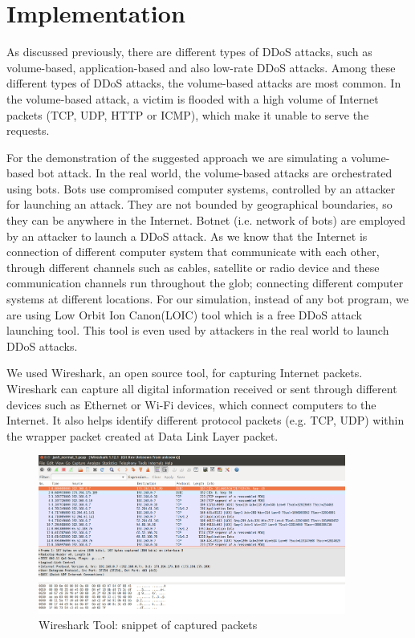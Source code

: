 \documentclass[12pt,oneside,a4paper]{article}
\begin{document}
\section{Implementation} \label{sec:Implementation}

As discussed previously, there are different types of DDoS attacks, such as volume-based, application-based and also low-rate DDoS attacks. Among these different types of DDoS attacks, the volume-based attacks are most common. In the volume-based attack, a victim is flooded with a high volume of Internet packets (TCP, UDP, HTTP or ICMP), which make it unable to serve the requests.

For the demonstration of the suggested approach we are simulating a volume-based bot attack. In the real world, the volume-based attacks are orchestrated using bots. Bots use compromised computer systems, controlled by an attacker for launching an attack. They are not bounded by geographical boundaries, so they can be anywhere in the Internet. Botnet (i.e. network of bots) are employed by an attacker to launch a DDoS attack. As we know that the Internet is connection of different computer system that communicate with each other, through different channels such as cables, satellite or radio device and these communication channels run throughout the glob; connecting different computer systems at different locations. For our simulation, instead of any bot program, we are using Low Orbit Ion Canon(LOIC) tool which is a free DDoS attack launching tool. This tool is even used by attackers in the real world to launch DDoS attacks.

We used Wireshark, an open source tool, for capturing Internet packets. Wireshark can capture all digital information received or sent through different devices such as Ethernet or Wi-Fi devices, which connect computers to the Internet. It also helps identify different protocol packets (e.g. TCP, UDP) within the wrapper packet created at Data Link Layer packet.\par

\begin{figure}[H]
\centering
\includegraphics[width=0.90\textwidth]{Wireshark_Tools.png}
\caption{Wireshark Tool: snippet of captured packets} \label{fig:wireshark}
\end{figure}
\end{document}
